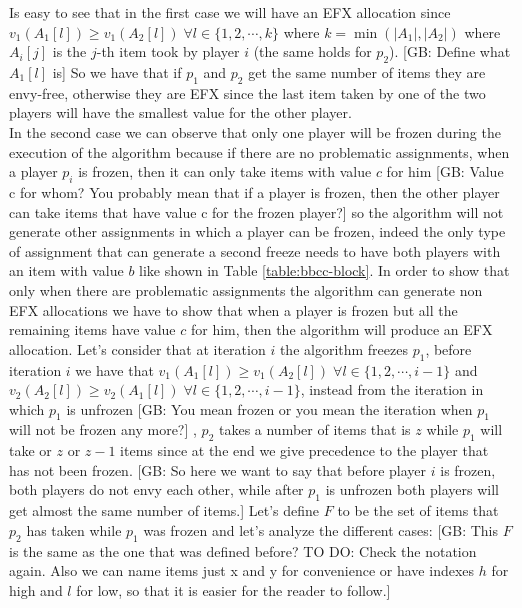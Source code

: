 \documentclass{article}
\newcommand{\gb}[1]{{\color{red}[GB: #1]}}
\begin{document}
Is easy to see that in the first case we will have an EFX allocation since $v_1(A_1[l])\ge v_1(A_2[l])\; \forall l \in \{1,2,\cdots,k\}$ where $k = \min (|A_1|, |A_2|)$ where $A_i[j]$ is the $j$-th item took by player $i$ (the same holds for $p_2$).
\gb{Define what $A_1[l]$ is}
So we have that if $p_1$ and $p_2$ get the same number of items they are envy-free, otherwise they are EFX since the last item taken by one of the two players will have the smallest value for the other player.\\
In the second case we can observe that only one player will be frozen during the execution of the algorithm because if there are no problematic assignments, when a player $p_i$ is frozen, then it can only take items with value $c$ for him
\gb{Value c for whom? You probably mean that if a player is frozen, then the other player can take items that have value c for the frozen player?}
so the algorithm will not generate other assignments in which a player can be frozen, indeed the only type of assignment that can generate a second freeze needs to have both players with an item with value $b$ like shown in Table \ref{table:bbcc-block}. In order to show that only when there are problematic assignments the algorithm can generate non EFX allocations we have to show that when a player is frozen but all the remaining items have value $c$ for him, then the algorithm will produce an EFX allocation.
Let's consider that at iteration $i$ the algorithm freezes $p_1$, before iteration $i$ we have that $v_1(A_1[l])\ge v_1(A_2[l]) \; \forall l \in \{1,2,\cdots, i-1\}$ and $v_2(A_2[l]) \ge v_2(A_1[l])\;\forall l \in \{1,2,\cdots,i-1\}$,  instead from the iteration in which $p_1$ is unfrozen
\gb{You mean frozen or you mean the iteration when $p_1$ will not be frozen any more?}
, $p_2$ takes a number of items that is $z$ while $p_1$ will take or $z$ or $z-1$ items since at the end we give precedence to the player that has not been frozen.
\gb{So here we want to say that before player $i$ is frozen, both players do not envy each other, while after $p_1$ is unfrozen both players will get almost the same number of items.}
Let's define $F$ to be the set of items that $p_2$ has taken while $p_1$ was frozen and let's analyze the different cases:
\gb{This $F$ is the same as the one that was defined before? TO DO: Check the notation again. Also we can name items just x and y for convenience or have indexes $h$ for high and $l$ for low, so that it is easier for the reader to follow.}
\end{document}
